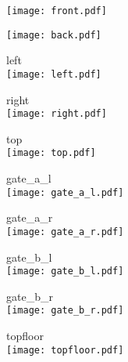 \documentclass[10pt,a4paper]{article}
\begin{document}
\begin{landscape}
\texttt{[image: front.pdf]}

\texttt{[image: back.pdf]}
\end{landscape}

left\\
\texttt{[image: left.pdf]}

right\\
\texttt{[image: right.pdf]}

top\\
\texttt{[image: top.pdf]}

gate\_a\_l\\
\texttt{[image: gate\_a\_l.pdf]}

gate\_a\_r\\
\texttt{[image: gate\_a\_r.pdf]}

gate\_b\_l\\
\texttt{[image: gate\_b\_l.pdf]}

gate\_b\_r\\
\texttt{[image: gate\_b\_r.pdf]}

topfloor\\
\texttt{[image: topfloor.pdf]}
\end{document}
